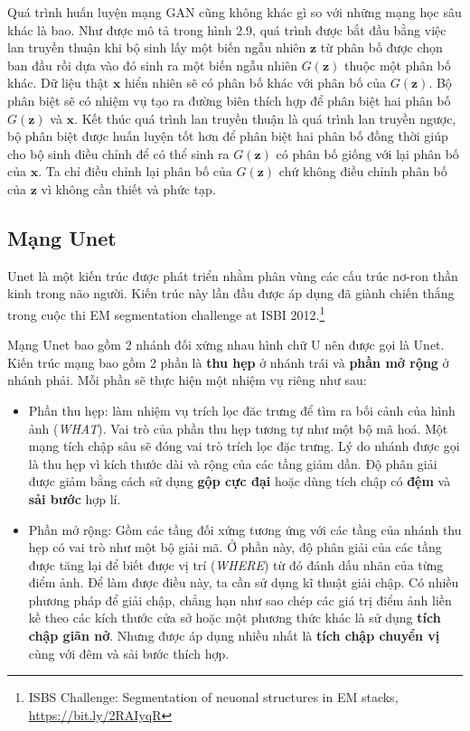 \documentclass[a4paper, 12pt]{article}
\begin{document}
\noindent
Quá trình huấn luyện mạng GAN cũng không khác gì so với những mạng học sâu khác là bao. Như được mô tả trong hình 2.9, quá trình được bắt đầu bằng việc lan truyền thuận khi bộ sinh lấy một biến ngẫu nhiên $\mathbf{z}$ từ phân bố được chọn ban đầu rồi dựa vào đó sinh ra một biến ngẫu nhiên $G(\mathbf{z})$ thuộc một phân bố khác. Dữ liệu thật $\mathbf{x}$ hiển nhiên sẽ có phân bố khác với phân bố của $G(\mathbf{z})$. Bộ phân biệt sẽ có nhiệm vụ tạo ra đường biên thích hợp để phân biệt hai phân bố $G(\mathbf{z})$ và $\mathbf{x}$. Kết thúc quá trình lan truyền thuận là quá trình lan truyền ngược, bộ phân biệt được huấn luyện tốt hơn để phân biệt hai phân bố đồng thời giúp cho bộ sinh điều chỉnh để có thể sinh ra $G(\mathbf{z})$ có phân bố giống với lại phân bố của $\mathbf{x}$. Ta chỉ điều chỉnh lại phân bố của $G(\mathbf{z})$ chứ không điều chỉnh phân bố của $\mathbf{z}$ vì không cần thiết và phức tạp.

\subsection{Mạng Unet}
Unet là một kiến trúc được phát triển nhằm phân vùng các cấu trúc nơ-ron thần kinh trong não người. Kiến trúc này lần đầu được áp dụng đã giành chiến thắng trong cuộc thi EM segmentation challenge at ISBI 2012.\footnote{ISBS Challenge: Segmentation of neuonal structures in EM stacks, \href{https://bit.ly/2RAIyqR}{https://bit.ly/2RAIyqR}}

\noindent
Mạng Unet bao gồm 2 nhánh đối xứng nhau hình chữ U nên được gọi là Unet. Kiến trúc mạng bao gồm 2 phần là \textbf{thu hẹp} ở nhánh trái và \textbf{phần mở rộng} ở nhánh phải. Mỗi phần sẽ thực hiện một nhiệm vụ riêng như sau:

\begin{itemize}
    \item Phần thu hẹp: làm nhiệm vụ trích lọc đăc trưng để tìm ra bối cảnh của hình ảnh (\textit{WHAT}). Vai trò của phần thu hẹp tương tự như một bộ mã hoá. Một mạng tích chập sâu sẽ đóng vai trò trích lọc đặc trưng. Lý do nhánh được gọi là thu hẹp vì kích thước dài và rộng của các tầng giảm dần. Độ phân giải được giảm bằng cách sử dụng \textbf{gộp cực đại} hoặc dùng tích chập có \textbf{đệm} và \textbf{sải bước} hợp lí.
    
    \item Phần mở rộng: Gồm các tầng đối xứng tương ứng với các tầng của nhánh thu hẹp có vai trò như một bộ giải mã. Ở phần này, độ phân giải của các tầng được tăng lại để biết được vị trí (\textit{WHERE}) từ đó đánh dấu nhãn của từng điểm ảnh. Để làm được điều này, ta cần sử dụng kĩ thuật giải chập. Có nhiều phương pháp để giải chập, chẳng hạn như sao chép các giá trị điểm ảnh liền kề theo các kích thước cửa sở hoặc một phương thức khác là sử dụng \textbf{tích chập giãn nở}. Nhưng được áp dụng nhiều nhất là \textbf{tích chập chuyển vị} cùng với đêm và sải bước thích hợp.
\end{itemize}
\end{document}
